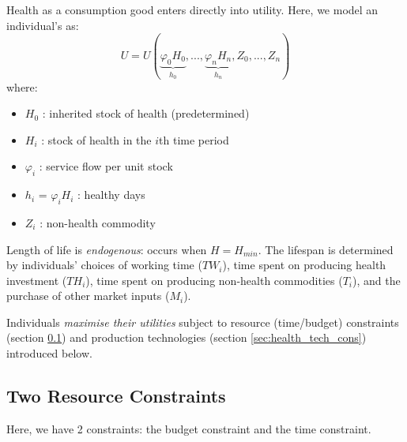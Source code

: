         Health as a consumption good enters directly into utility. Here, we model an individual's  as:
        \begin{equation*}
            U = U(\underbrace{\varphi_0 H_0}_{h_0},...,\underbrace{\varphi_n H_n}_{h_n},Z_0,...,Z_n)
        \end{equation*}
        where:
        \begin{itemize}
            \item $H_0$ : inherited stock of health (predetermined)
            \item $H_i$ : stock of health in the $i$th time period
            \item $\varphi_i$ : service flow per unit stock
            \item $h_i$ = $\varphi_iH_i$ : healthy days
            \item $Z_i$ : non-health commodity
        \end{itemize}
        Length of life is \emph{endogenous}:  occurs when $H = H_{min}$. The lifespan is determined by individuals' choices of working time ($TW_i$), time spent on producing health investment ($TH_i$), time spent on producing non-health commodities ($T_i$), and the purchase of other market inputs ($M_i$).
        
        Individuals \emph{maximise their utilities} subject to resource (time/budget) constraints (section \ref{sec:health_res_cons}) and production technologies (section \ref{sec:health_tech_cons}) introduced below.

    \subsection{Two Resource Constraints}\label{sec:health_res_cons}
    
        Here, we have 2 constraints: the budget constraint and the time constraint.

